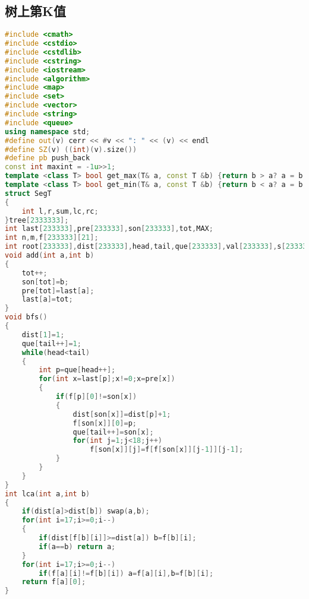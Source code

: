 \subsection{树上第K值}
    \begin{lstlisting}[language=c++]
#include <cmath>
#include <cstdio>
#include <cstdlib>
#include <cstring>
#include <iostream>
#include <algorithm>
#include <map>
#include <set>
#include <vector>
#include <string>
#include <queue>
using namespace std;
#define out(v) cerr << #v << ": " << (v) << endl
#define SZ(v) ((int)(v).size())
#define pb push_back
const int maxint = -1u>>1;
template <class T> bool get_max(T& a, const T &b) {return b > a? a = b, 1: 0;}
template <class T> bool get_min(T& a, const T &b) {return b < a? a = b, 1: 0;}
struct SegT
{
    int l,r,sum,lc,rc;
}tree[2333333];
int last[233333],pre[233333],son[233333],tot,MAX;
int n,m,f[233333][21];
int root[233333],dist[233333],head,tail,que[233333],val[233333],s[233333];
void add(int a,int b)
{
    tot++;
    son[tot]=b;
    pre[tot]=last[a];
    last[a]=tot;
}
void bfs()
{
    dist[1]=1;
    que[tail++]=1;
    while(head<tail)
    {
        int p=que[head++];
        for(int x=last[p];x!=0;x=pre[x])
        {
            if(f[p][0]!=son[x])
            {
                dist[son[x]]=dist[p]+1;
                f[son[x]][0]=p;
                que[tail++]=son[x];
                for(int j=1;j<18;j++)
                    f[son[x]][j]=f[f[son[x]][j-1]][j-1];
            }    
        }    
    }
}
int lca(int a,int b)
{
    if(dist[a]>dist[b]) swap(a,b);
    for(int i=17;i>=0;i--)
    {
        if(dist[f[b][i]]>=dist[a]) b=f[b][i];
        if(a==b) return a;    
    }    
    for(int i=17;i>=0;i--)
        if(f[a][i]!=f[b][i]) a=f[a][i],b=f[b][i];
    return f[a][0];
}


\end{lstlisting}
